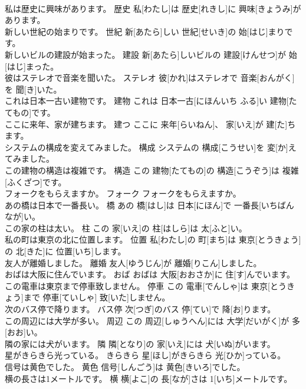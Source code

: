 \documentclass[8pt]{extreport}
\begin{document}
\begin{CJK}{UTF8}{min}
\\	私は歴史に興味があります。	歴史	私[わたし]は 歴史[れきし]に 興味[きょうみ]があります。	
\\	新しい世紀の始まりです。	世紀	新[あたら]しい 世紀[せいき]の 始[はじ]まりです。	
\\	新しいビルの建設が始まった。	建設	新[あたら]しいビルの 建設[けんせつ]が 始[はじ]まった。	
\\	彼はステレオで音楽を聞いた。	ステレオ	彼[かれ]はステレオで 音楽[おんがく]を 聞[き]いた。	
\\	これは日本一古い建物です。	建物	これは 日本一古[にほんいち ふる]い 建物[たてもの]です。	
\\	ここに来年、家が建ちます。	建つ	ここに 来年[らいねん]、 家[いえ]が 建[た]ちます。	
\\	システムの構成を変えてみました。	構成	システムの 構成[こうせい]を 変[か]えてみました。	
\\	この建物の構造は複雑です。	構造	この 建物[たてもの]の 構造[こうぞう]は 複雑[ふくざつ]です。	
\\	フォークをもらえますか。	フォーク	フォークをもらえますか。	
\\	あの橋は日本で一番長い。	橋	あの 橋[はし]は 日本[にほん]で 一番長[いちばん なが]い。	
\\	この家の柱は太い。	柱	この 家[いえ]の 柱[はしら]は 太[ふと]い。	
\\	私の町は東京の北に位置します。	位置	私[わたし]の 町[まち]は 東京[とうきょう]の 北[きた]に 位置[いち]します。	
\\	友人が離婚しました。	離婚	友人[ゆうじん]が 離婚[りこん]しました。	
\\	おばは大阪に住んでいます。	おば	おばは 大阪[おおさか]に 住[す]んでいます。	
\\	この電車は東京まで停車致しません。	停車	この 電車[でんしゃ]は 東京[とうきょう]まで 停車[ていしゃ] 致[いた]しません。	
\\	次のバス停で降ります。	バス停	次[つぎ]のバス 停[てい]で 降[お]ります。	
\\	この周辺には大学が多い。	周辺	この 周辺[しゅうへん]には 大学[だいがく]が 多[おお]い。	
\\	隣の家には犬がいます。	隣	隣[となり]の 家[いえ]には 犬[いぬ]がいます。	
\\	星がきらきら光っている。	きらきら	星[ほし]がきらきら 光[ひか]っている。	
\\	信号は黄色でした。	黄色	信号[しんごう]は 黄色[きいろ]でした。	
\\	横の長さは1メートルです。	横	横[よこ]の 長[なが]さは 1[いち]メートルです。	

\end{CJK}
\end{document}
